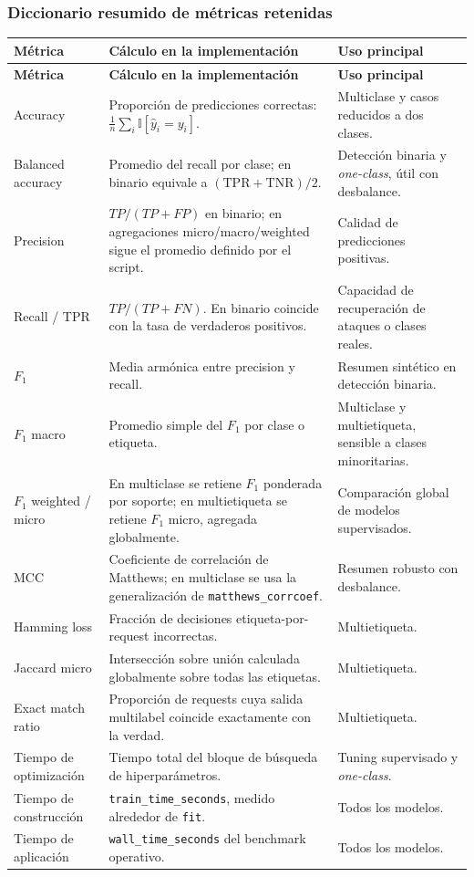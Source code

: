 \documentclass[12pt,oneside]{report}
\newcommand{\ind}{\mathbb{I}} %
\begin{document}
\subsubsection{Diccionario resumido de métricas retenidas}
\footnotesize
\begin{longtable}{@{}>{\RaggedRight\arraybackslash}p{3.2cm}>{\RaggedRight\arraybackslash}p{6.2cm}>{\RaggedRight\arraybackslash}p{4.1cm}@{}}
\toprule
\textbf{Métrica} & \textbf{Cálculo en la implementación} & \textbf{Uso principal} \\
\midrule
\endfirsthead
\toprule
\textbf{Métrica} & \textbf{Cálculo en la implementación} & \textbf{Uso principal} \\
\midrule
\endhead
Accuracy & Proporción de predicciones correctas: $\frac{1}{n}\sum_i \ind[\hat y_i=y_i]$. & Multiclase y casos reducidos a dos clases. \\
Balanced accuracy & Promedio del recall por clase; en binario equivale a $(\mathrm{TPR}+\mathrm{TNR})/2$. & Detección binaria y \textit{one-class}, útil con desbalance. \\
Precision & $TP/(TP+FP)$ en binario; en agregaciones micro/macro/weighted sigue el promedio definido por el script. & Calidad de predicciones positivas. \\
Recall / TPR & $TP/(TP+FN)$. En binario coincide con la tasa de verdaderos positivos. & Capacidad de recuperación de ataques o clases reales. \\
$F_1$ & Media armónica entre precision y recall. & Resumen sintético en detección binaria. \\
$F_1$ macro & Promedio simple del $F_1$ por clase o etiqueta. & Multiclase y multietiqueta, sensible a clases minoritarias. \\
$F_1$ weighted / micro & En multiclase se retiene $F_1$ ponderada por soporte; en multietiqueta se retiene $F_1$ micro, agregada globalmente. & Comparación global de modelos supervisados. \\
MCC & Coeficiente de correlación de Matthews; en multiclase se usa la generalización de \texttt{matthews\_corrcoef}. & Resumen robusto con desbalance. \\
Hamming loss & Fracción de decisiones etiqueta-por-request incorrectas. & Multietiqueta. \\
Jaccard micro & Intersección sobre unión calculada globalmente sobre todas las etiquetas. & Multietiqueta. \\
Exact match ratio & Proporción de requests cuya salida multilabel coincide exactamente con la verdad. & Multietiqueta. \\
Tiempo de optimización & Tiempo total del bloque de búsqueda de hiperparámetros. & Tuning supervisado y \textit{one-class}. \\
Tiempo de construcción & \texttt{train\_time\_seconds}, medido alrededor de \texttt{fit}. & Todos los modelos. \\
Tiempo de aplicación & \texttt{wall\_time\_seconds} del benchmark operativo. & Todos los modelos. \\
\bottomrule
\end{longtable}
\normalsize
\end{document}
